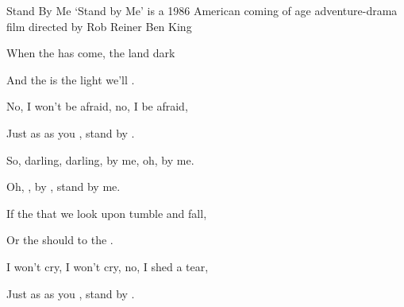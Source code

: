 \begin{SBSong}{Stand By Me}
  {`Stand by Me' is a 1986 American coming of age adventure-drama film directed by Rob Reiner}
  {Ben King}
  \begin{SBVerse}
    When the  has come,  the land dark 
    
    And the  is the  light we'll . 
    
    No, I won't be afraid, no, I  be afraid, 
    
    Just as  as you , stand by . 
  \end{SBVerse}
  \begin{SBChorus}
    So, darling, darling,  by me, oh,  by me. 
    
    Oh, ,  by , stand by me. 
  \end{SBChorus}
  \begin{SBVerse}
    If the  that we look upon  tumble and fall, 
    
    Or the  should  to the . 
    
    I won't cry, I won't cry, no, I  shed a tear, 
    
    Just as  as you , stand by . 
  \end{SBVerse}
\end{SBSong}
